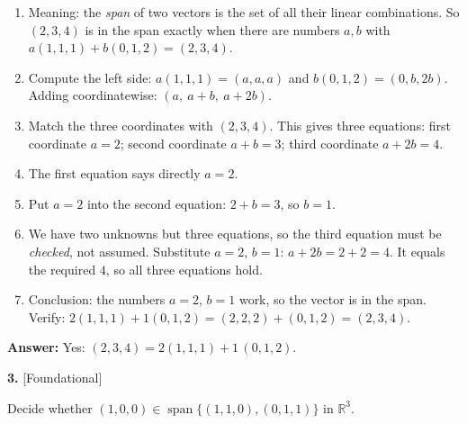 \documentclass[11pt]{article}
\begin{document}
\begin{tcolorbox}[breakable,colback=ans,colframe=ansb,boxrule=0.5pt,left=4pt,right=4pt,top=2pt,bottom=2pt]\begin{enumerate}[leftmargin=2.2em,itemsep=1pt,topsep=1pt,label=\textbf{Step \arabic*.}]\item Meaning: the \emph{span} of two vectors is the set of all their linear combinations. So $(2,3,4)$ is in the span exactly when there are numbers $a,b$ with $a(1,1,1)+b(0,1,2)=(2,3,4)$.
\item Compute the left side: $a(1,1,1)=(a,a,a)$ and $b(0,1,2)=(0,b,2b)$. Adding coordinatewise: $(a,\ a+b,\ a+2b)$.
\item Match the three coordinates with $(2,3,4)$. This gives three equations: first coordinate $a=2$; second coordinate $a+b=3$; third coordinate $a+2b=4$.
\item The first equation says directly $a=2$.
\item Put $a=2$ into the second equation: $2+b=3$, so $b=1$.
\item We have two unknowns but three equations, so the third equation must be \emph{checked}, not assumed. Substitute $a=2$, $b=1$: $a+2b=2+2=4$. It equals the required $4$, so all three equations hold.
\item Conclusion: the numbers $a=2$, $b=1$ work, so the vector is in the span. Verify: $2(1,1,1)+1(0,1,2)=(2,2,2)+(0,1,2)=(2,3,4)$.
\end{enumerate}\textbf{Answer:} Yes: $(2,3,4)=2(1,1,1)+1\,(0,1,2)$.\end{tcolorbox}
\par\vspace{2pt}
\begin{minipage}{\linewidth}\textbf{3.} \hfill{\scriptsize\color{ink}[Foundational]}\par\nopagebreak Decide whether $(1,0,0)\in\operatorname{span}\{(1,1,0),(0,1,1)\}$ in $\mathbb{R}^{3}$.
\end{minipage}\par\nopagebreak
\end{document}
